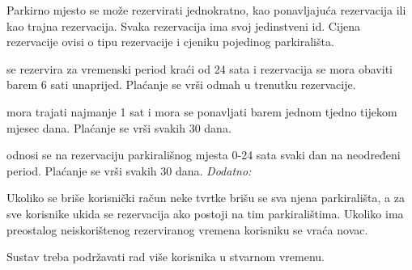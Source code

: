 Parkirno mjesto se može rezervirati jednokratno, kao ponavljajuća rezervacija ili kao trajna rezervacija. Svaka rezervacija ima svoj jedinstveni id. Cijena rezervacije ovisi o tipu rezervacije i cjeniku pojedinog parkirališta.

\textit{} se rezervira za vremenski period kraći od 24 sata i rezervacija se mora obaviti barem 6 sati unaprijed. Plaćanje se vrši odmah u trenutku rezervacije.

\textit{} mora trajati najmanje 1 sat i mora se ponavljati barem jednom tjedno tijekom mjesec dana. Plaćanje se vrši svakih 30 dana.

\textit{} odnosi se na rezervaciju parkirališnog mjesta 0-24 sata svaki dan na neodređeni period. Plaćanje se vrši svakih 30 dana.
\newline
\newline
\textit{Dodatno:}

Ukoliko se briše korisnički račun neke tvrtke brišu se sva njena parkirališta, a za sve korisnike ukida se rezervacija ako postoji na tim parkiralištima. Ukoliko ima preostalog neiskorištenog rezerviranog vremena korisniku se vraća novac.

Sustav treba podržavati rad više korisnika u stvarnom vremenu.

